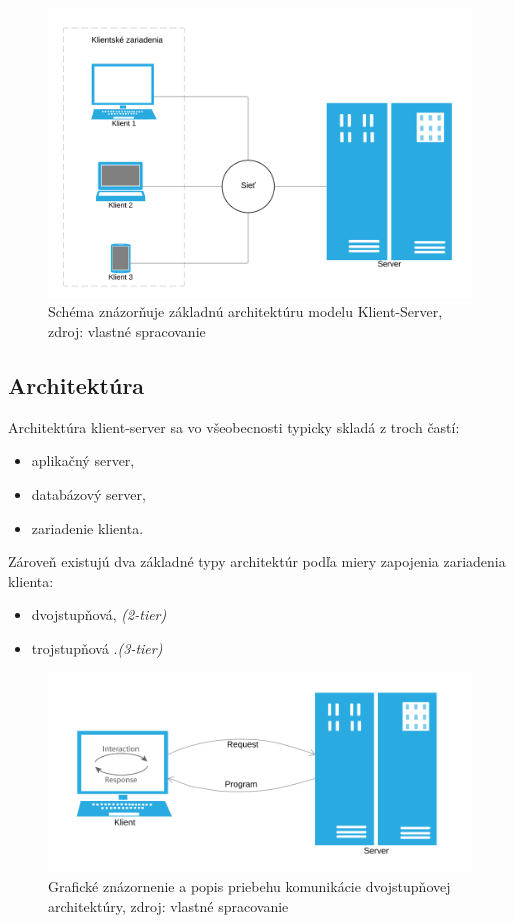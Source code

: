 \documentclass[
  printed, %
  table,   %
  lof,     %
  nolot,   %
  nocover
]{fithesis3}
\begin{document}
\begin{figure}[t]
  \centering
    \includegraphics[width=.94\textwidth]{images/C-S-basic.png}
  \caption{Schéma znázorňuje základnú architektúru modelu Klient-Server, zdroj:
  vlastné spracovanie}
  \label{fig:cs-basic}
\end{figure}

\subsection{Architektúra}
Architektúra klient-server sa vo všeobecnosti typicky skladá z troch 
častí:
\begin{itemize}
	\item aplikačný server,
	\item databázový server,
	\item zariadenie klienta.
\end{itemize}
Zároveň existujú dva základné typy architektúr podľa miery zapojenia zariadenia klienta: 
\begin{itemize}
	\item dvojstupňová, \textit{(2-tier)}
	\item trojstupňová .\textit{(3-tier)}
\end{itemize}

\begin{figure}[t]
  \centering
    \includegraphics[width=.89\textwidth]{images/C-S-thick.png}
  \caption{Grafické znázornenie a popis priebehu komunikácie dvojstupňovej architektúry,
  zdroj: vlastné spracovanie}
  \label{fig:cs-thick}
\end{figure}
\end{document}
